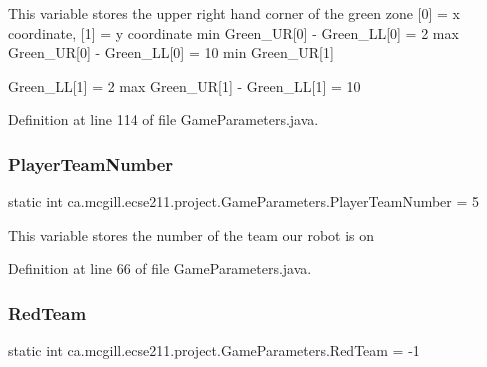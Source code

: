 This variable stores the upper right hand corner of the green zone \mbox{[}0\mbox{]} = x coordinate, \mbox{[}1\mbox{]} = y coordinate min Green\+\_\+\+UR\mbox{[}0\mbox{]} -\/ Green\+\_\+\+LL\mbox{[}0\mbox{]} = 2 max Green\+\_\+\+UR\mbox{[}0\mbox{]} -\/ Green\+\_\+\+LL\mbox{[}0\mbox{]} = 10 min Green\+\_\+\+UR\mbox{[}1\mbox{]}
\begin{DoxyItemize}
\item Green\+\_\+\+LL\mbox{[}1\mbox{]} = 2 max Green\+\_\+\+UR\mbox{[}1\mbox{]} -\/ Green\+\_\+\+LL\mbox{[}1\mbox{]} = 10 
\end{DoxyItemize}

Definition at line 114 of file Game\+Parameters.\+java.

\mbox{\label{enumca_1_1mcgill_1_1ecse211_1_1project_1_1_game_parameters_aa3fb61a4aa9d34ab4dd029eccb6e056c}} 
\subsubsection{\texorpdfstring{Player\+Team\+Number}{PlayerTeamNumber}}
{\footnotesize\ttfamily  static  int ca.\+mcgill.\+ecse211.\+project.\+Game\+Parameters.\+Player\+Team\+Number = 5\hspace{0.3cm}{\ttfamily [static]}}

This variable stores the number of the team our robot is on 

Definition at line 66 of file Game\+Parameters.\+java.

\mbox{\label{enumca_1_1mcgill_1_1ecse211_1_1project_1_1_game_parameters_ad36fe5629718c944df7317e53145850c}} 
\subsubsection{\texorpdfstring{Red\+Team}{RedTeam}}
{\footnotesize\ttfamily  static  int ca.\+mcgill.\+ecse211.\+project.\+Game\+Parameters.\+Red\+Team = -\/1\hspace{0.3cm}{\ttfamily [static]}}

